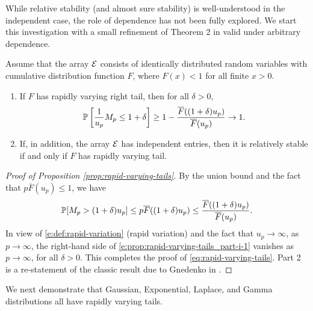 While relative stability (and almost sure stability) is well-understood in the independent case, the role of dependence has not been fully explored.
We start this investigation with a small refinement of Theorem 2 in \citet{gnedenko1943distribution} valid under arbitrary dependence.

\begin{proposition} \label{prop:rapid-varying-tails}
Assume that the array ${\cal E}$ consists of identically distributed random 
variables with cumulative distribution function $F$, where $F(x)<1$ for all finite $x>0$. 
\begin{enumerate}
    \item If $F$ has rapidly varying right tail, then for all $\delta>0$,
        \begin{equation} \label{eq:rapid-varying-tails}
            \P\left[\frac{1}{u_p} M_p\le1+\delta\right] \ge 1 - \frac{\overline F((1+\delta)u_p)}{\overline F(u_p)} \to 1.
        \end{equation}
    \item If, in addition, the array ${\cal E}$ has independent entries, then it is relatively stable if and only if $F$ has rapidly varying tail.
    \label{prop:rapid-varying-tails_part-ii}
\end{enumerate}
\end{proposition}

\begin{proof}[Proof of Proposition \ref{prop:rapid-varying-tails}] 
By the union bound and the fact that 
$p\overline F(u_p) \le 1$, we have
\begin{align}\label{e:prop:rapid-varying-tails_part-i-1}
\P [ M_p > (1+\delta)u_p] \le p \overline F((1+\delta)u_p)
 \le \frac{\overline F((1+\delta)u_p)}{\overline F(u_p)}.
\end{align}
In view of \eqref{e:def:rapid-variation} (rapid variation) and the fact that $u_p\to\infty$, as $p\to\infty$, the right-hand side of \eqref{e:prop:rapid-varying-tails_part-i-1} vanishes 
as $p\to\infty$, for all $\delta>0$.  This completes the proof of \eqref{eq:rapid-varying-tails}. Part 2 is a re-statement of the classic result due to Gnedenko in \cite{gnedenko1943distribution}.
\end{proof}

We next demonstrate that Gaussian, Exponential, Laplace, and Gamma distributions all have rapidly varying tails. 

